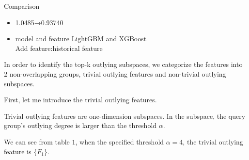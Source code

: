 \documentclass[
 size=12pt,
 paper=smartboard,  %
 mode=present, 		%
 display=slides, 	%
 style=tuliplab,  	%
 pauseslide,
 fleqn,leqno]{powerdot}
\begin{document}
\begin{slide}{Comparison}
  \begin{itemize}
    \item
    1.0485→0.93740
    \smallskip
    \item
    model and feature
    \smallskip
    LightGBM and XGBoost \\
    Add feature:historical feature

  \end{itemize}
    
    \begin{note}
    In order to identify the top-k outlying subspaces,
    we categorize the features into $2$ non-overlapping groups,
    trivial outlying features and non-trivial outlying subspaces.
    
    First, let me introduce the trivial outlying features.
    
    Trivial outlying features are one-dimension subspaces.
    In the subspace,
    the query group's outlying degree is larger than the threshold $\alpha$.
    
    We can see from table $1$,
    when the specified threshold $\alpha = 4$,
    the trivial outlying feature is \{$F_1$\}.
    \end{note}
    
    \end{slide}

% 

\end{document}
